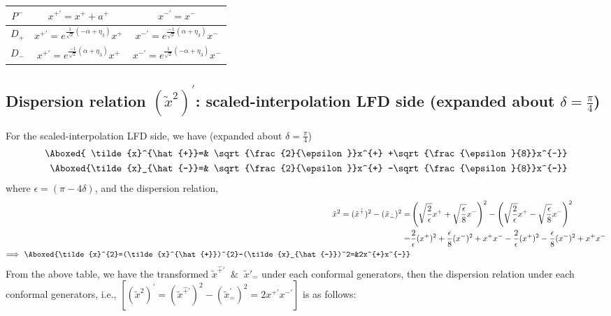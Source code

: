 \documentclass[]{article}
\numberwithin{equation}{section}
\begin{document}
{{\begin{table}[h!]
{\begin{tabular}{|c|c|c|}
             \hline
              \rule{0pt}{16pt}$P^{-}$ & $x^{+\prime}=x^{+}+a^{+}$ & $x^{-\prime}=x^{-}$\\
             \hline
             \rule{0pt}{16pt}$D_{+}$ & $x^{+\prime}=e^{\frac{1}{\sqrt{2}}(-\alpha+\eta_{3})}x^{+}$ & $x^{-\prime}=e^{\frac{-1}{\sqrt{2}}(\alpha+\eta_{3})}x^{-}$\\
             \hline
              \rule{0pt}{16pt}$D_{-}$& $x^{+\prime}=e^{\frac{-1}{\sqrt{2}}(\alpha+\eta_{3})}x^{+}$ & $x^{-\prime}=e^{\frac{1}{\sqrt{2}}(-\alpha+\eta_{3})}x^{-}$\\
             \hline
        \end{tabular}}
        \label{tab:my_label}
\end{table}
\pagebreak
\subsection{Dispersion relation $(\tilde{x}^2)^{\prime}$: scaled-interpolation LFD side (expanded about $\delta=\frac{\pi}{4}$)}
For the scaled-interpolation LFD side, we have (expanded about $\delta=\frac{\pi}{4}$)
\begin{align}
   \Aboxed{ \tilde{x}^{\hat{+}}=& \sqrt{\frac{2}{\epsilon}}x^{+} +\sqrt{\frac{\epsilon}{8}}x^{-}}\\
     \Aboxed{\tilde{x}_{\hat{-}}=& \sqrt{\frac{2}{\epsilon}}x^{+}  -\sqrt{\frac{\epsilon}{8}}x^{-}}
\end{align}
where $\epsilon=(\pi-4\delta)$, and the dispersion relation,
\begin{align}
    \tilde{x}^{2}=(\tilde{x}^{\hat{+}})^{2}-(\tilde{x}_{\hat{-}})^2=&\left(\sqrt{\frac{2}{\epsilon}}x^{+} +\sqrt{\frac{\epsilon}{8}}x^{-}\right)^2-\left(\sqrt{\frac{2}{\epsilon}}x^{+}  -\sqrt{\frac{\epsilon}{8}}x^{-}\right)^2\\
    =&\frac{2}{\epsilon}(x^{+})^{2}+\frac{\epsilon}{8}(x^{-})^{2}+x^{+}x^{-}-\frac{2}{\epsilon}(x^{+})^{2}-\frac{\epsilon}{8}(x^{-})^{2}+x^{+}x^{-}\\
    \Longrightarrow~\Aboxed{\tilde{x}^{2}=(\tilde{x}^{\hat{+}})^{2}-(\tilde{x}_{\hat{-}})^2=&2x^{+}x^{-}}
\end{align}
From the above table, we have the transformed $\tilde{x}^{\hat{+}\prime}$ $~\&~$ $\tilde{x}'_{\hat{-}}$ under each conformal generators, then the dispersion relation under each conformal generators, i.e., $[(\tilde{x}^2)^{\prime}=(\tilde{x}^{\hat{+}\prime})^2-(\tilde{x}^{\prime}_{\hat{-}})^2=2x^{+\prime}x^{-\prime}]$ is as follows:
\begin{table}[h!]

\end{table}}}
\end{document}
